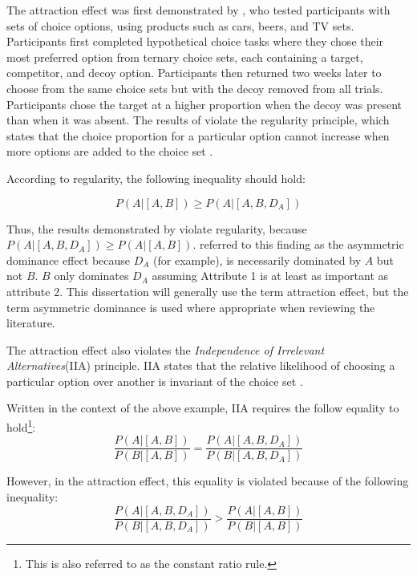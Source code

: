 The attraction effect was first demonstrated by \textcite{huberAddingAsymmetricallyDominated1982d}, who tested participants with sets of choice options, using products such as cars, beers, and TV sets. Participants first completed hypothetical choice tasks where they chose their most preferred option from ternary choice sets, each containing a target, competitor, and decoy option. Participants then returned two weeks later to choose from the same choice sets but with the decoy removed from all trials. Participants chose the target at a higher proportion when the decoy was present than when it was absent. The results of \textcite{huberAddingAsymmetricallyDominated1982d} violate the regularity principle, which states that the choice proportion for a particular option cannot increase when more options are added to the choice set \parencite{mackay1995probabilistic,marley1989random}.

According to regularity, the following inequality should hold:

\begin{equation}
  P(A|[A,B])\geq P(A|[A,B,D_{A}])
  \label{eqn:reg_att}
\end{equation}

Thus, the results demonstrated by \textcite{huberAddingAsymmetricallyDominated1982d} violate regularity, because $P(A|[A,B,D_{A}])\geq P(A|[A,B])$. \textcite{huberAddingAsymmetricallyDominated1982d} referred to this finding as the asymmetric dominance effect because $D_{A}$ (for example), is necessarily dominated by $A$ but not $B$. $B$ only dominates $D_{A}$ assuming Attribute 1 is at least as important as attribute 2. This dissertation will generally use the term attraction effect, but the term asymmetric dominance is used where appropriate when reviewing the literature.

The attraction effect also violates the \textit{Independence of Irrelevant Alternatives}(IIA) principle. IIA states that the relative likelihood of choosing a particular option over another is invariant of the choice set \parencite{ray1973independence}. 

Written in the context of the above example, IIA requires the follow equality to hold\footnote{This is also referred to as the constant ratio rule.}: 
\begin{equation}
  \frac{P(A|[A,B])}{P(B|[A,B])}=\frac{P(A|[A,B,D_{A}])}{P(B|[A,B,D_{A}])}
  \label{eqn:iia_att}
\end{equation}

However, in the attraction effect, this equality is violated because of the following inequality:
\begin{equation}
  \frac{P(A|[A,B,D_{A}])}{P(B|[A,B,D_{A}])}>\frac{P(A|[A,B])}{P(B|[A,B])}
  \label{eqn:iia_att1}
\end{equation}

